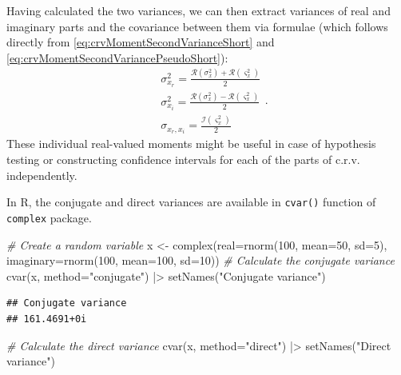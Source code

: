 \documentclass[
]{book}
\newenvironment{Shaded}{\begin{snugshade}}{\end{snugshade}}
\newcommand{\AttributeTok}[1]{\textcolor[rgb]{0.77,0.63,0.00}{#1}}
\newcommand{\CommentTok}[1]{\textcolor[rgb]{0.56,0.35,0.01}{\textit{#1}}}
\newcommand{\DecValTok}[1]{\textcolor[rgb]{0.00,0.00,0.81}{#1}}
\newcommand{\FunctionTok}[1]{\textcolor[rgb]{0.00,0.00,0.00}{#1}}
\newcommand{\NormalTok}[1]{#1}
\newcommand{\OtherTok}[1]{\textcolor[rgb]{0.56,0.35,0.01}{#1}}
\newcommand{\SpecialCharTok}[1]{\textcolor[rgb]{0.00,0.00,0.00}{#1}}
\newcommand{\StringTok}[1]{\textcolor[rgb]{0.31,0.60,0.02}{#1}}
\begin{document}
Having calculated the two variances, we can then extract variances of real and imaginary parts and the covariance between them via formulae (which follows directly from \eqref{eq:crvMomentSecondVarianceShort} and \eqref{eq:crvMomentSecondVariancePseudoShort}):
\begin{equation}
    \begin{aligned}
        & \sigma_{x_r}^2 = \frac{\mathcal{R}(\sigma^2_x) + \mathcal{R}(\varsigma^2_x)}{2} \\
        & \sigma_{x_i}^2 = \frac{\mathcal{R}(\sigma^2_x) - \mathcal{R}(\varsigma^2_x)}{2} \\
        & \sigma_{x_r,x_i} = \frac{\mathcal{I}(\varsigma^2_x)}{2}
    \end{aligned} .
    \label{eq:IndividualVariances}
\end{equation}
These individual real-valued moments might be useful in case of hypothesis testing or constructing confidence intervals for each of the parts of c.r.v. independently.

In R, the conjugate and direct variances are available in \texttt{cvar()} function of \texttt{complex} package.

\begin{Shaded}
\begin{Highlighting}[]
\CommentTok{\# Create a random variable}
\NormalTok{x }\OtherTok{\textless{}{-}} \FunctionTok{complex}\NormalTok{(}\AttributeTok{real=}\FunctionTok{rnorm}\NormalTok{(}\DecValTok{100}\NormalTok{, }\AttributeTok{mean=}\DecValTok{50}\NormalTok{, }\AttributeTok{sd=}\DecValTok{5}\NormalTok{),}
             \AttributeTok{imaginary=}\FunctionTok{rnorm}\NormalTok{(}\DecValTok{100}\NormalTok{, }\AttributeTok{mean=}\DecValTok{100}\NormalTok{, }\AttributeTok{sd=}\DecValTok{10}\NormalTok{))}
\CommentTok{\# Calculate the conjugate variance}
\FunctionTok{cvar}\NormalTok{(x, }\AttributeTok{method=}\StringTok{"conjugate"}\NormalTok{) }\SpecialCharTok{|\textgreater{}}
    \FunctionTok{setNames}\NormalTok{(}\StringTok{"Conjugate variance"}\NormalTok{)}
\end{Highlighting}
\end{Shaded}

\begin{verbatim}
## Conjugate variance 
## 161.4691+0i
\end{verbatim}

\begin{Shaded}
\begin{Highlighting}[]
\CommentTok{\# Calculate the direct variance}
\FunctionTok{cvar}\NormalTok{(x, }\AttributeTok{method=}\StringTok{"direct"}\NormalTok{) }\SpecialCharTok{|\textgreater{}}
    \FunctionTok{setNames}\NormalTok{(}\StringTok{"Direct variance"}\NormalTok{)}
\end{Highlighting}
\end{Shaded}
\end{document}
